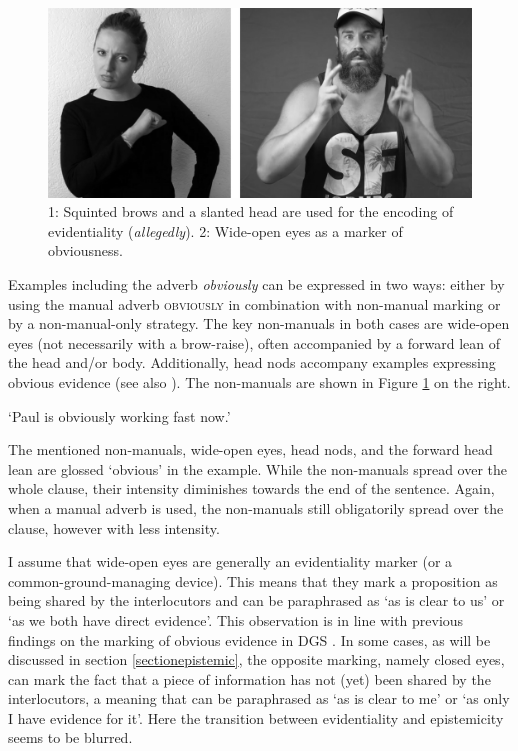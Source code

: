 \begin{figure}[bt]
\centering
	\includegraphics[width=1.0\textwidth]{allegedly-evidential3sw.jpg}
	\caption{1: Squinted brows and a slanted head are used for the encoding of evidentiality (\textit{allegedly}). 2: Wide-open eyes as a marker of obviousness.}
	\label{fig:allegedly}
\end{figure}

\noindent Examples including the adverb \textit{obviously} can be expressed in two ways: either by using the manual adverb \textsc{obviously} in combination with non-manual marking or by a non-manual-only strategy. The key non-manuals in both cases are wide-open eyes (not necessarily with a brow-raise), often accompanied by a forward lean of the head and/or body. Additionally, head nods accompany examples expressing obvious evidence (see also \citealt[133]{herrmann2013modal}). The non-manuals are shown in Figure \ref{fig:allegedly} on the right. 

\begin{exe}
\ex\label{ex:obiousness}  
\glt `Paul is obviously working fast now.'
\end{exe}

\noindent The mentioned non-manuals, wide-open eyes, head nods, and the forward head lean are glossed `obvious' in the example. While the non-manuals spread over the whole clause, their intensity diminishes towards the end of the sentence. Again, when a manual adverb is used, the non-manuals still obligatorily spread over the clause, however with less intensity.


I assume that wide-open eyes are generally an evidentiality marker (or a com\-mon-ground-managing device). This means that they mark a proposition as being shared by the interlocutors and can be paraphrased as `as is clear to us' or `as we both have direct evidence'.\label{obviousness} This observation is in line with previous findings on the marking of obvious evidence in DGS \citep[133]{herrmann2013modal}. In some cases, as will be discussed in section \ref{sectionepistemic}, the opposite marking, namely closed eyes, can mark the fact that a piece of information has not (yet) been shared by the interlocutors, a meaning that can be paraphrased as `as is clear to me' or `as only I have evidence for it'. Here the transition between evidentiality and epistemicity seems to be blurred.

